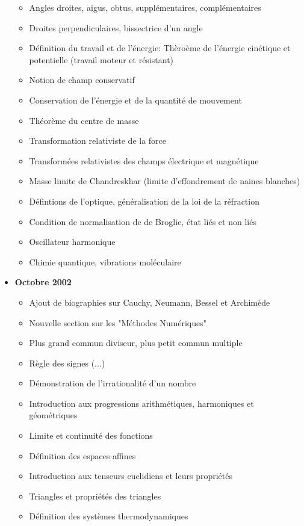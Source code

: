 \documentclass[12pt,a4paper,twoside,openright]{report}
\theoremstyle{definition}
\theoremstyle{itexmp}
\numberwithin{equation}{section}
\begin{document}
\begin{itemize}
\begin{itemize}[noitemsep]
				\item Angles droites, aigus, obtus, supplémentaires, complémentaires
				\item Droites perpendiculaires, bissectrice d'un angle
				\item Définition du travail et de l'énergie: Thèroème de l'énergie cinétique et potentielle (travail moteur et résistant)
				\item Notion de champ conservatif
				\item Conservation de l'énergie et de la quantité de mouvement
				\item Théorème du centre de masse
				\item Transformation relativiste de la force
				\item Transformées relativistes des champs électrique et magnétique
				\item Masse limite de Chandreskhar (limite d'effondrement de naines blanches)
				\item Défintions de l'optique, généralisation de la loi de la réfraction
				\item Condition de normalisation de de Broglie, état liés et non liés
				\item Oscillateur harmonique
				\item Chimie quantique, vibrations moléculaire
			\end{itemize}
		\item \textbf{Octobre 2002}
			\begin{itemize}[noitemsep]
				\item Ajout de biographies sur Cauchy, Neumann, Bessel et Archimède
				\item Nouvelle section sur les "Méthodes Numériques"
				\item Plus grand commun diviseur, plus petit commun multiple
				\item Règle des signes (...)
				\item Démonstration de l'irrationalité d'un nombre
				\item Introduction aux progressions arithmétiques, harmoniques et géométriques
				\item Limite et continuité des fonctions
				\item Définition des espaces affines
				\item Introduction aux tenseurs euclidiens et leurs propriétés
				\item Triangles et propriétés des triangles
				\item Définition des systèmes thermodynamiques

\end{itemize}
\end{itemize}
\end{document}
